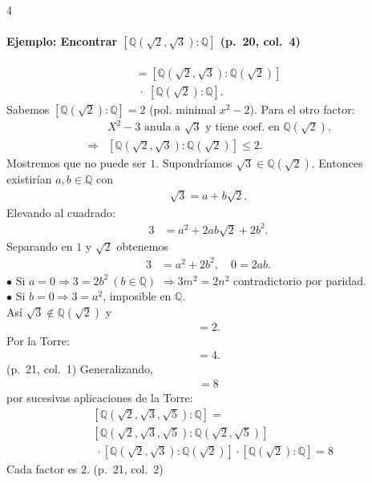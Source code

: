 \documentclass[landscape,a4paper]{article}
\begin{document}
\begin{multicols}{4}
\paragraph{Ejemplo: Encontrar $[\mathbb{Q}(\sqrt2,\sqrt3):\mathbb{Q}]$ (p.~20, col.~4)}
\begin{align*}
  [\mathbb{Q}(\sqrt2,\sqrt3):\mathbb{Q}] = [\mathbb{Q}(\sqrt2,\sqrt3):\mathbb{Q}(\sqrt2)]\\\;\cdot\;[\mathbb{Q}(\sqrt2):\mathbb{Q}].
\end{align*}
Sabemos $[\mathbb{Q}(\sqrt2):\mathbb{Q}]=2$ (pol. minimal $x^{2}-2$).
Para el otro factor:
\begin{align*}
  &X^{2}-3 \text{ anula a } \sqrt3 \text{ y tiene coef. en } \mathbb{Q}(\sqrt2),\\\;\Rightarrow 
  &[\mathbb{Q}(\sqrt2,\sqrt3):\mathbb{Q}(\sqrt2)]\le 2.
\end{align*}
Mostremos que no puede ser $1$.
Supondríamos $\sqrt3\in\mathbb{Q}(\sqrt2)$. Entonces existirían $a,b\in\mathbb{Q}$ con
\begin{align*}
  \sqrt3 = a + b\sqrt2.
\end{align*}
Elevando al cuadrado:
\begin{align*}
  3 &= a^{2} + 2ab\sqrt2 + 2b^{2}.
\end{align*}
Separando en $1$ y $\sqrt2$ obtenemos
\begin{align*}
  3 &= a^{2} + 2b^{2},\quad 0 = 2ab.
\end{align*}
$\bullet$ Si $a=0\Rightarrow 3 = 2b^{2}\ (b\in\mathbb{Q})$ $\Rightarrow 3m^{2}=2n^{2}$ contradictorio por paridad.\\
$\bullet$ Si $b=0\Rightarrow 3=a^{2}$, imposible en $\mathbb{Q}$.\\
Así $\sqrt3\notin \mathbb{Q}(\sqrt2)$ y
\begin{align*}
  [\mathbb{Q}(\sqrt2,\sqrt3):\mathbb{Q}(\sqrt2)] = 2.
\end{align*}
Por la Torre:
\begin{align*}
  [\mathbb{Q}(\sqrt2,\sqrt3):\mathbb{Q}] = 4.
\end{align*}
(p.~21, col.~1)
Generalizando,
\begin{align*}
  [\mathbb{Q}(\sqrt2,\sqrt3,\sqrt5):\mathbb{Q}] = 8
\end{align*}
por sucesivas aplicaciones de la Torre:
\begin{align*}
  &[\mathbb{Q}(\sqrt2,\sqrt3,\sqrt5):\mathbb{Q}] = \\ &[\mathbb{Q}(\sqrt2,\sqrt3,\sqrt5):\mathbb{Q}(\sqrt2,\sqrt5)]\\
  &\;\cdot[\mathbb{Q}(\sqrt2,\sqrt3):\mathbb{Q}(\sqrt2)]\cdot[\mathbb{Q}(\sqrt2):\mathbb{Q}]=8
\end{align*}
Cada factor es $2$. (p.~21, col.~2)

\end{multicols}
\end{document}
